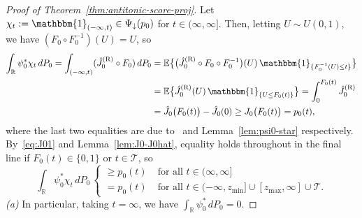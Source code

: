 \documentclass[a4paper]{article}
\newcommand{\R}{\mathbb{R}}
\newcommand{\E}{\mathbb{E}}
\newcommand{\Ind}{\mathbbm{1}}
\theoremstyle{definition}
\begin{document}
\begin{proof}[Proof of Theorem~\ref{thm:antitonic-score-proj}]
Let $\chi_t := \Ind_{(-\infty,t)} \in \Psi_\downarrow(p_0)$ for $t \in (\infty,\infty]$. Then, letting $U \sim U(0,1)$, we have $(F_0 \circ F_0^{-1})(U) = U$, so
\begin{align*}
\int_\R\psi_0^*\chi_t\,dP_0 = \int_{(-\infty,t)}(\hat{J}_0^{(\mathrm{R})} \circ F_0)\,dP_0 &= \E\bigl\{\bigl(\hat{J}_0^{(\mathrm{R})} \circ F_0 \circ F_0^{-1}\bigr)(U)\,\Ind_{\{F_0^{-1}(U) \leq t\}}\bigr\} \\
&= \E\bigl\{\hat{J}_0^{(\mathrm{R})}(U)\,\Ind_{\{U \leq F_0(t)\}}\bigr\} = \int_0^{F_0(t)}\hat{J}_0^{(\mathrm{R})} \\
&= \hat{J}_0\bigl(F_0(t)\bigr) - \hat{J}_0(0) \geq J_0\bigl(F_0(t)\bigr) = p_0(t),
\end{align*}
where the last two equalities are due to~\citet[Corollary~24.2.1]{rockafellar97convex} and Lemma~\ref{lem:psi0-star} respectively. By~\eqref{eq:J01} and Lemma~\ref{lem:J0-J0hat}, equality holds throughout in the final line if $F_0(t) \in \{0,1\}$ or $t \in \mathcal{T}$, so
\begin{equation}
\label{eq:KKT-ind}
\int_\R\psi_0^*\chi_t\,dP_0\,
\begin{cases}
\geq p_0(t) &\;\text{for all }t \in (\infty,\infty] \\
= p_0(t) &\;\text{for all }t \in (-\infty,z_{\min}] \cup [z_{\max},\infty] \cup \mathcal{T}.
\end{cases}
\end{equation}
\textit{(a)} In particular, taking $t = \infty$, we have $\int_\R \psi_0^*\,dP_0 = 0$.


\end{proof}
\end{document}
